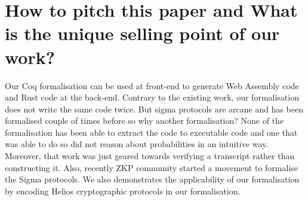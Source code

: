 \documentclass[sigconf]{acmart}
\begin{document}
\section{How to pitch this paper and What is the unique selling point of our work?}
Our Coq formalisation can be used at front-end to generate Web Assembly code and 
Rust code at the back-end. Contrary to the existing work, our formalisation
does not write the same code twice. But sigma protocols are arcane and has 
been formalised couple of times before so why another formalisation?
None of the formalisation has been able to extract the code to executable code 
and one that was able to do so did not reason about probabilities in an intuitive way.
Moreover, that work was just geared towards verifying a transcript rather than
constructing it. Also, recently ZKP community started a movement to 
formalise the Sigma protocols. We also demonstrates the 
applicability of our formalisation by encoding Helios cryptographic protocols
in our formalisation. 
\end{document}
